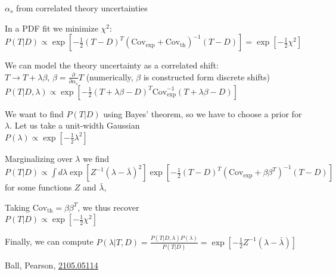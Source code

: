 \documentclass[8pt,t]{beamer}
\begin{document}
\begin{frame}{$\alpha_s$ from correlated theory uncertainties}

  In a PDF fit we minimize $\chi^2$:\\
  $P(T|D) \propto \exp\left[-\frac{1}{2}\left(T-D\right)^T\left(\mathrm{Cov}_\mathrm{exp}+\mathrm{Cov}_\mathrm{th}\right)^{-1}\left(T-D\right)\right]
  = \exp\left[-\frac{1}{2}\chi^2\right]$

  \vspace*{1em}
  We can model the theory uncertainty as a correlated shift: \\
  $T \rightarrow T + \lambda \beta $, \quad $\beta=\frac{\partial}{\partial \alpha_s}T$ (numerically, $\beta$ is constructed form discrete shifts)\\
  $P(T|D,\lambda) \propto \exp\left[-\frac{1}{2}\left(T+\lambda\beta-D\right)^T\mathrm{Cov}_\mathrm{exp}^{-1}\left(T+\lambda\beta-D\right)\right]$

  \vspace*{1em}
  We want to find $P(T|D)$ using Bayes' theorem, so we have to choose a prior for $\lambda$. Let us take a unit-width Gaussian\\
  $P(\lambda) \propto \exp\left[-\frac{1}{2}\lambda^2\right]$

  \vspace*{1em}
  Marginalizing over $\lambda$ we find \\
  $P(T|D) \propto \int d\lambda \exp\left[Z^{-1}\left(\lambda-\bar{\lambda}\right)^2\right] \exp\left[-\frac{1}{2}\left(T-D\right)^T\left(\mathrm{Cov}_\mathrm{exp}+\beta\beta^T\right)^{-1}\left(T-D\right)\right]$ \\
  for some functions $Z$ and $\bar{\lambda}$,

  \vspace*{1em}
  Taking $\mathrm{Cov_\mathrm{th}}=\beta\beta^T$, we thus recover \\
  $P(T|D)\propto \exp\left[-\frac{1}{2}\chi^2\right]$

  \vspace*{1em}
  Finally, we can compute
  $P(\lambda|T,D) = \frac{P(T|D,\lambda)P(\lambda)}{P(T|D)}=\exp\left[-\frac{1}{2}Z^{-1}(\lambda - \bar{\lambda})\right]$


  \vfill
  {\color{gray} \footnotesize Ball, Pearson, \hyperlink{https://arxiv.org/abs/2105.05114}{2105.05114}}
\end{frame}
\end{document}
